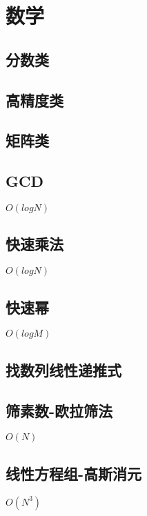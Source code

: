 \documentclass[10pt]{article}
\begin{document}
\section{数学}
\subsection{分数类}


\subsection{高精度类}


\subsection{矩阵类}


\subsection{GCD}
$O(logN)$


\subsection{快速乘法}
$O(logN)$


\subsection{快速幂}
$O(logM)$


\subsection{找数列线性递推式}


\subsection{筛素数-欧拉筛法}
$O(N)$


\subsection{线性方程组-高斯消元}
$O(N^3)$

\end{document}

